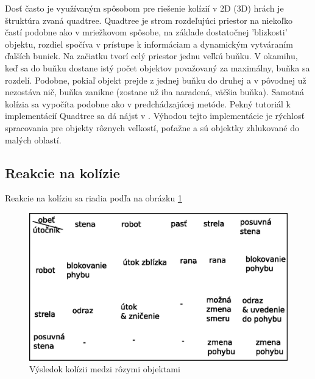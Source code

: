 \indent Dosť často je využívaným spôsobom pre riešenie kolízií v 2D (3D) hrách je štruktúra zvaná quadtree. Quadtree je strom rozdeľujúci priestor na niekoľko častí podobne ako v mriežkovom spôsobe, na základe dostatočnej 'blizkosti' objektu, rozdiel spočíva v prístupe k informáciam a dynamickým vytváraním ďalších buniek. Na začiatku tvorí celý priestor jednu veľkú buňku. V okamihu, keď sa do buňku dostane istý počet objektov považovaný za maximálny, buňka sa rozdelí. Podobne, pokiaľ objekt prejde z jednej buňku do druhej a v pôvodnej už nezostáva nič, buňka zanikne (zostane už iba naradená, väčšia buňka). Samotná kolízia sa vypočíta podobne ako v predchádzajúcej metóde. Pekný tutoriál k implementácií Quadtree sa dá  nájst v \cite{quadtree}. Výhodou tejto implementácie je rýchlosť spracovania pre objekty rôznych veľkostí, poťažne a sú objektky zhlukované do malých oblastí.
\subsection{Reakcie na kolízie}
Reakcie na kolíziu sa riadia podľa na obrázku \ref{fig:kol}
\begin {figure}
\centering
\includegraphics{kolizie}
\caption { Výsledok kolízii medzi rôzymi objektami }
\label{fig:kol}
\end {figure}

